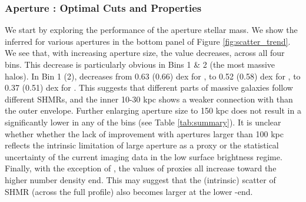 \documentclass[fleqn,usenatbib,useAMS,english]{mnras}
\begin{document}
\subsubsection{Aperture \mstar: Optimal Cuts and \dsigma{} Properties}
    \label{sec:m_aper}

    We start by exploring the performance of the aperture stellar mass.
    We show the inferred \sigmvir{} for various apertures in the bottom panel of Figure
    \ref{fig:scatter_trend}. We see that, with increasing aperture size, the \sigmvir{} value decreases,
    across all four bins.
    This decrease is particularly obvious in Bins 1 \& 2 (the most massive halos).
    In Bin 1 (2), \sigmvir{} decreases from 0.63 (0.66) dex for , to 0.52 (0.58)
    dex for , to 0.37 (0.51) dex for .
    This suggests that different parts of massive galaxies follow different SHMRs, and
    the inner 10-30 kpc shows a weaker connection with \mvir{} than the outer envelope.
    Further enlarging aperture size to 150 kpc does not result in a significantly lower
    \sigmvir{} in any of the bins (see Table \ref{tab:summary}).
    It is unclear whether whether the lack of improvement with apertures larger than
    100 kpc reflects the intrinsic limitation of large aperture \mstar{} as a \mvir{} proxy
    or the statistical uncertainty of the current imaging data in the low surface brightness regime.
    Finally, with the exception of , the \sigmvir{} values of \mstar{} proxies all
    increase toward the higher number density end.
    This may suggest that the (intrinsic) scatter of SHMR (across the full profile) also
    becomes larger at the lower \mvir{}-end.
\end{document}
